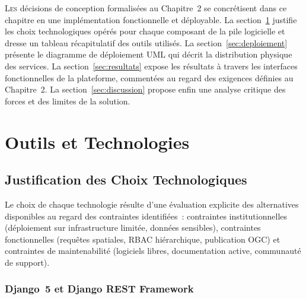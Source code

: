 \lettrine[lines=2, loversize=0.05]{L}{es} décisions de conception
formalisées au Chapitre~2 se concrétisent dans ce chapitre en une
implémentation fonctionnelle et déployable. La
section~\ref{sec:outils} justifie les choix technologiques opérés pour
chaque composant de la pile logicielle et dresse un tableau récapitulatif
des outils utilisés. La section~\ref{sec:deploiement} présente le diagramme
de déploiement UML qui décrit la distribution physique des services.
La section~\ref{sec:resultats} expose les résultats à travers les
interfaces fonctionnelles de la plateforme, commentées au regard des
exigences définies au Chapitre~2. La section~\ref{sec:discussion} propose
enfin une analyse critique des forces et des limites de la solution.

\section{Outils et Technologies}
\label{sec:outils}

\subsection{Justification des Choix Technologiques}
\label{ssec:justification}

Le choix de chaque technologie résulte d'une évaluation explicite des
alternatives disponibles au regard des contraintes identifiées~: contraintes
institutionnelles (déploiement sur infrastructure limitée, données
sensibles), contraintes fonctionnelles (requêtes spatiales, RBAC
hiérarchique, publication OGC) et contraintes de maintenabilité
(logiciels libres, documentation active, communauté de support).

\subsubsection{Django~5 et Django REST Framework}

